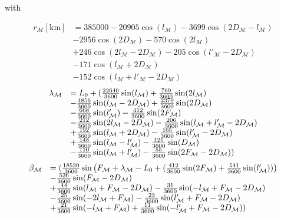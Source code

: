 \documentclass{article}
\begin{document}
with

\begin{equation}
\begin{array}{ll}
r_{{\mathcal M}}[\mbox{km}] &= 385000-20905 \cos(l_{{{\mathcal M}}})-3699 \cos(2 D_{{{\mathcal M}}}-l_{{{\mathcal M}}}) \\
&-2956 \cos(2 D_{{{\mathcal M}}})-570 \cos(2 l_{{{\mathcal M}}})\\
&+246\cos(2 l_{{{\mathcal M}}}-2 D_{{{\mathcal M}}})-205 \cos(l'_{{{\mathcal M}}}-2 D_{{{\mathcal M}}})\\
&-171 \cos(l_{{{\mathcal M}}}+2 D_{{{\mathcal M}}})\\
&-152 \cos(l_{{{\mathcal M}}}+l'_{{{\mathcal M}}}-2 D_{{{\mathcal M}}})
\end{array}
\end{equation}
\begin{equation}
\begin{array}{ll}
\begin{array}{ll}
\lambda_{\mathcal M} &= L_0+ ( {22640\over 3600} \sin(l_{\mathcal M})
+ {769\over 3600} \sin(2 l_{\mathcal M})\\
&- {4856\over 3600} \sin(l_{\mathcal M} - 2 D_{\mathcal M})
+ {2370\over 3600} \sin(2 D_{\mathcal M})\\
&- {668\over 3600} \sin(l'_{\mathcal M}) - {412\over 3600} \sin(2 F_{\mathcal M})\\
&- {212\over 3600} \sin(2 l_{\mathcal M} - 2 D_{\mathcal M})
- {206\over 3600} \sin(l_{\mathcal M} + l'_{\mathcal M} - 2 D_{\mathcal M})\\
&+ {192\over 3600} \sin(l_{\mathcal M} + 2 D_{\mathcal M})
- {165\over 3600} \sin(l'_{\mathcal M} - 2 D_{\mathcal M})\\
&+ {148\over 3600} \sin(l_{\mathcal M} - l'_{\mathcal M})
- {125\over 3600} \sin(D_{\mathcal M})\\
&- {110\over 3600} \sin(l_{\mathcal M} + l'_{\mathcal M})
- {55\over 3600} \sin(2 F_{\mathcal M} - 2 D_{\mathcal M}) )
\end{array}
\end{array}
\end{equation}
\begin{equation}
\begin{array}{ll}
\beta_{{\mathcal M}} &= ( {18520\over 3600} \sin\left(F_{{\mathcal M}}
+ \lambda_{{\mathcal M}}-L_0 +  ( {412\over 3600} \sin(2F_{{\mathcal M}})
+ {541\over 3600} \sin(l'_{{\mathcal M}})) \right)\\
&- {526\over 3600} \sin(F_{{\mathcal M}} - 2D_{{\mathcal M}})\\
&+ {44\over 3600} \sin(l_{{\mathcal M}} + F_{{\mathcal M}} - 2D_{{\mathcal M}})
- {31\over 3600} \sin(-l_{{\mathcal M}} + F_{{\mathcal M}} - 2D_{{\mathcal M}})\\
&- {25\over 3600} \sin(-2l_{{\mathcal M}} + F_{\mathcal M})
- {23\over 3600} \sin(l'_{\mathcal M}
+ F_{\mathcal M} - 2D_{\mathcal M})\\
&+ {21\over 3600} \sin(-l_{\mathcal M} + F_{\mathcal M})
+ {11\over 3600} \sin(-l'_{\mathcal M} + F_{\mathcal M} - 2D_{\mathcal M}) )
\end{array}
\end{equation}
\end{document}

